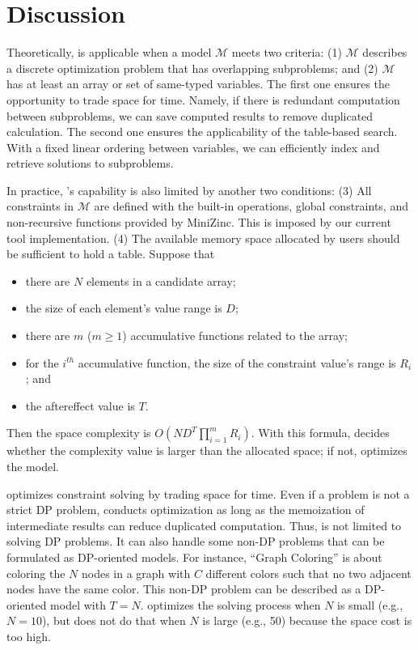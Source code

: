 \section{Discussion}

Theoretically, \tool is applicable when a model $\mathcal{M}$ meets two criteria:
(1) $\mathcal{M}$ describes a discrete optimization problem that has overlapping subproblems; and
(2) $\mathcal{M}$ has at least an array or set of same-typed variables.
The first one ensures the opportunity to trade space for time. Namely, if there is redundant computation between subproblems, we can save computed results to remove duplicated calculation.
The second one ensures the applicability of the table-based search. With a fixed linear ordering between variables, we can efficiently index and retrieve solutions to subproblems.

In practice, \tool’s capability is also limited by another two conditions:
(3) All constraints in $\mathcal{M}$ are defined with the built-in operations, global constraints, and non-recursive functions provided by MiniZinc. This is imposed by our current tool implementation.
(4) The available memory space allocated by users should be sufficient to hold a table. Suppose that
\begin{itemize}
\item there are $N$ elements in a candidate array;
\item the size of each element’s value range is $D$;
\item there are $m$ ($m \geq 1$) accumulative functions related to the array;
\item for the $i^{th}$ accumulative function, the size of the constraint value’s range is $R_i$; and
\item the aftereffect value is $T$.
\end{itemize}
Then the space complexity is $O(N D^T \prod\limits_{i=1}^m R_i)$. With this formula, \tool decides whether the complexity value is larger than the allocated space; if not, \tool optimizes the model.

\tool optimizes constraint solving by trading space for time. Even if a problem is not a strict DP problem, 
\tool conducts optimization as long as the memoization of intermediate results can reduce duplicated computation. 
Thus, \tool is not limited to solving DP problems. It can also handle some non-DP problems that can be formulated as DP-oriented models. 
For instance, ``Graph Coloring'' is about coloring the $N$ nodes in a graph with $C$ different colors such that no two adjacent nodes have the same color. 
This non-DP problem can be described as a DP-oriented model with $T=N$. \tool optimizes the solving process when $N$ is small (e.g., $N=10$), but does not do that when $N$ is large (e.g., 50) because the space cost is too high.

